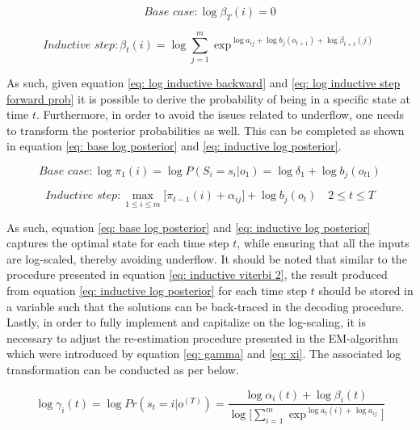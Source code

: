 \begin{equation}
     \textit{Base case}: \log\beta_T(i) = 0
    \label{eq: log base backward}
\end{equation}

\begin{equation}
    \textit{Inductive step}: \beta_t(i) = \log\sum_{j=1}^m \exp^{\log a_{ij}+\log b_j(o_{t+1})+\log \beta_{t+1}(j)}
    \label{eq: log inductive backward}
\end{equation}

As such, given equation \ref{eq: log inductive backward} and \ref{eq: log inductive step forward prob} it is possible to derive the probability of being in a specific state at time $t$. Furthermore, in order to avoid the issues related to underflow, one needs to transform the posterior probabilities as well. This can be completed as shown in equation \ref{eq: base log posterior} and \ref{eq: inductive log posterior}.

\begin{equation}
    \textit{Base case}: \log \pi_1(i) = \log P(S_i = s_i | o_1) = \log \delta_1 + \log b_j(o_{t1}) 
    \label{eq: base log posterior}
\end{equation}

\begin{equation}
    \textit{Inductive step}: \max_{1\leq i \leq m} \Big[\pi_{t-1}(i) + \alpha_{ij}\Big] + \log b_j(o_t) \quad 2\leq t \leq T
    \label{eq: inductive log posterior}
\end{equation}

As such, equation \ref{eq: base log posterior} and \ref{eq: inductive log posterior} captures the optimal state for each time step $t$, while ensuring that all the inputs are log-scaled, thereby avoiding underflow. It should be noted that similar to the procedure presented in equation \ref{eq: inductive viterbi 2}, the result produced from equation \ref{eq: inductive log posterior} for each time step $t$ should be stored in a variable such that the solutions can be back-traced in the decoding procedure. Lastly, in order to fully implement and capitalize on the log-scaling, it is necessary to adjust the re-estimation procedure presented in the EM-algorithm which were introduced by equation \ref{eq: gamma} and \ref{eq: xi}. The associated log transformation can be conducted as per below.

\begin{equation}
    \log\gamma_i(t) = \log Pr(s_t=i|o^{(T)}) = \frac{\log\alpha_i(t) + \log\beta_i(t)}{\log\Big[\sum_{i=1}^m \exp^{\log a_t(i)+\log a_{ij}}\Big]}  
    \label{eq: log gamma}
\end{equation}

